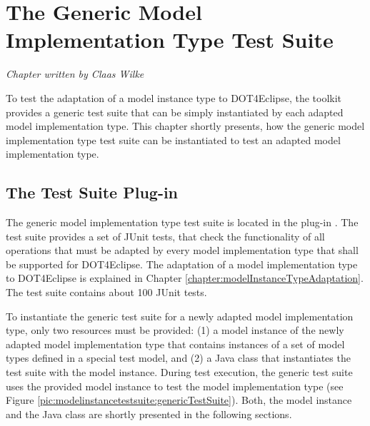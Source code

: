 \chapter{The Generic Model Implementation Type Test Suite}
\label{chapter:modelInstanceTestSuite}

\begin{flushright}
\textit{Chapter written by Claas Wilke}
\end{flushright}

To test the adaptation of a model instance type to \acl{DOT4Eclipse}, the toolkit provides a generic test suite that can be simply instantiated by each adapted model implementation type. This chapter shortly presents, how the generic model implementation type test suite can be instantiated to test an adapted model implementation type.



\section{The Test Suite Plug-in}

The generic model implementation type test suite is located in the plug-in . The test suite provides a set of JUnit tests, that check the functionality of all operations that must be adapted by every model implementation type that shall be supported for \acl{DOT4Eclipse}. The adaptation of a model implementation type to \acl{DOT4Eclipse} is explained in Chapter \ref{chapter:modelInstanceTypeAdaptation}. The test suite contains about 100 JUnit tests.

To instantiate the generic test suite for a newly adapted model implementation type, only two resources must be provided: (1) a model instance of the newly adapted model implementation type that contains instances of a set of model types defined in a special test model, and (2) a Java class that instantiates the test suite with the model instance. During test execution, the generic test suite uses the provided model instance to test the model implementation type (see Figure \ref{pic:modelinstancetestsuite:genericTestSuite}). Both, the model instance and the Java class are shortly presented in the following sections.

